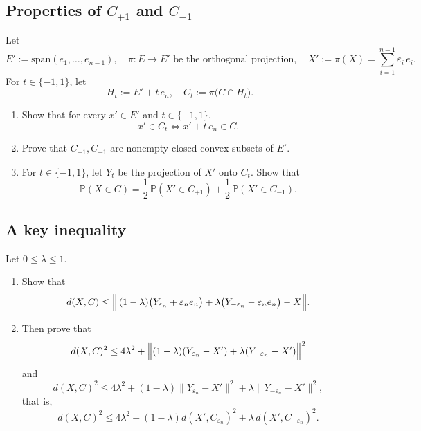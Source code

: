 \documentclass[a4paper]{report}
\begin{document}
\subsection{Properties of \(C_{+1}\) and \(C_{-1}\)}
Let
\[
E':=\mathrm{span}(e_1,\dots,e_{n-1}),\quad
\pi:E\to E'\text{ be the orthogonal projection},
\quad
X':=\pi(X)=\sum_{i=1}^{n-1}\varepsilon_i\,e_i.
\]
For \(t\in\{-1,1\}\), let
\[
H_t := E' + t\,e_n,\quad
C_t := \pi\bigl(C\cap H_t\bigr).
\]
\begin{enumerate}
\item Show that for every \(x'\in E'\) and \(t\in\{-1,1\}\),
  \[
  x'\in C_t \iff x' + t\,e_n\in C.
  \]
\item Prove that \(C_{+1},C_{-1}\) are nonempty closed convex subsets of \(E'\).
\item For \(t\in\{-1,1\}\), let \(Y_t\) be the projection of \(X'\) onto \(C_t\).
Show that
  \[
  \mathbb{P}(X\in C)
  = \frac12\,\mathbb{P}(X'\in C_{+1})
  + \frac12\,\mathbb{P}(X'\in C_{-1}).
  \]
\end{enumerate}

\subsection{A key inequality}
Let \(0\leq\lambda\leq1\).
\begin{enumerate}
\item Show that
  \[
  d(X,C)\le \Bigl\|\,(1-\lambda)\bigl(Y_{\varepsilon_n}+\varepsilon_n e_n\bigr)
  +\lambda\bigl(Y_{-\varepsilon_n}-\varepsilon_n e_n\bigr)-X\Bigr\|.
  \]
\item Then prove that
  \[
  d(X,C)^2\le 4\lambda^2+\Bigl\|(1-\lambda)(Y_{\varepsilon_n}-X')
  +\lambda(Y_{-\varepsilon_n}-X')\Bigr\|^2
  \]
and
  \[
  d(X,C)^2\le 4\lambda^2+(1-\lambda)\|Y_{\varepsilon_n}-X'\|^2
  +\lambda\|Y_{-\varepsilon_n}-X'\|^2,
  \]
that is,
  \[
  d(X,C)^2\le 4\lambda^2+(1-\lambda)d(X',C_{\varepsilon_n})^2
  +\lambda\,d(X',C_{-\varepsilon_n})^2.
  \]
\end{enumerate}
\end{document}
